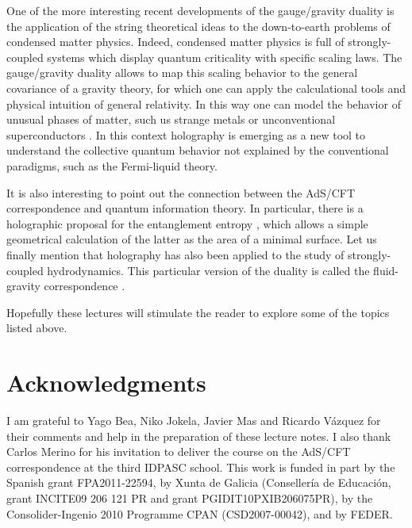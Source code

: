 \documentclass[12pt,notitlepage]{article}
\begin{document}
One of the more interesting  recent developments of the gauge/gravity duality is the application of the string theoretical ideas to the down-to-earth problems of condensed matter physics. Indeed, condensed matter physics is full of strongly-coupled systems which display quantum criticality with specific scaling laws. The gauge/gravity duality allows to map this scaling behavior to the general covariance of a gravity theory, for which one can apply the calculational tools and physical intuition of general relativity. 
In this way one can  model the behavior of unusual phases of matter, such us strange metals or unconventional superconductors \cite{Hartnoll:2009sz, Sachdev:2010ch,Sachdev:2011wg,Green:2013fqa}. In this context holography is emerging as a new tool to understand the collective quantum behavior not explained by the conventional paradigms, such as the Fermi-liquid theory. 

It is also interesting to point out the connection between the AdS/CFT correspondence and quantum information theory. In particular, there is a holographic proposal for the entanglement entropy \cite{Nishioka:2009un,Takayanagi:2012kg}, which allows a simple geometrical calculation of the latter as the area of a minimal surface. Let us finally mention that holography has also been applied to the study of strongly-coupled hydrodynamics. This particular version of the duality is called the fluid-gravity correspondence \cite{Rangamani:2009xk,Hubeny:2011hd}. 


Hopefully these lectures will stimulate the reader to explore some of the topics listed above. 

%
\section*{Acknowledgments}


I am grateful to Yago Bea,  Niko Jokela,  Javier Mas and Ricardo V\'azquez for their comments and help in the preparation of these lecture notes. I also thank Carlos Merino for his invitation to deliver the course on the AdS/CFT correspondence at the third IDPASC school.  This  work is funded in part by the Spanish grant 
FPA2011-22594,  by Xunta de Galicia (Conseller{\'i}a de Educaci\'on, grant 
INCITE09 206 121 PR and grant PGIDIT10PXIB206075PR),  by the 
Consolider-Ingenio 2010 Programme CPAN (CSD2007-00042), and by FEDER.

%
%
%
\end{document}
